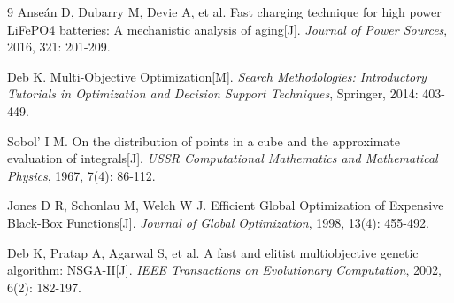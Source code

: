 \documentclass[12pt,a4paper]{article}
\begin{document}
\begin{thebibliography}{9}
    Anseán D, Dubarry M, Devie A, et al. Fast charging technique for high power LiFePO4 batteries: A mechanistic analysis of aging[J]. \textit{Journal of Power Sources}, 2016, 321: 201-209.

    Deb K. Multi-Objective Optimization[M]. \textit{Search Methodologies: Introductory Tutorials in Optimization and Decision Support Techniques}, Springer, 2014: 403-449.

    Sobol' I M. On the distribution of points in a cube and the approximate evaluation of integrals[J]. \textit{USSR Computational Mathematics and Mathematical Physics}, 1967, 7(4): 86-112.

    Jones D R, Schonlau M, Welch W J. Efficient Global Optimization of Expensive Black-Box Functions[J]. \textit{Journal of Global Optimization}, 1998, 13(4): 455-492.

    Deb K, Pratap A, Agarwal S, et al. A fast and elitist multiobjective genetic algorithm: NSGA-II[J]. \textit{IEEE Transactions on Evolutionary Computation}, 2002, 6(2): 182-197.
\end{thebibliography}
\endgroup
\label{body:end}
\end{document}
